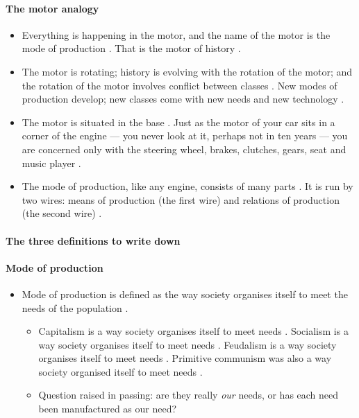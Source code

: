 \paragraph{The motor analogy}
\begin{itemize}
    \item Everything is happening in the motor, and the name of the motor is the mode of production . That is the motor of history .
    \item The motor is rotating; history is evolving with the rotation of the motor; and the rotation of the motor involves conflict between classes . New modes of production develop; new classes come with new needs and new technology .
    \item The motor is situated in the base . Just as the motor of your car sits in a corner of the engine --- you never look at it, perhaps not in ten years --- you are concerned only with the steering wheel, brakes, clutches, gears, seat and music player .
    \item The mode of production, like any engine, consists of many parts . It is run by two wires: means of production (the first wire) and relations of production (the second wire) .
\end{itemize}

\paragraph{The three definitions to write down}

\paragraph{Mode of production}
\begin{itemize}
    \item Mode of production is defined as the way society organises itself to meet the needs of the population .
    \begin{itemize}
        \item Capitalism is a way society organises itself to meet needs . Socialism is a way society organises itself to meet needs . Feudalism is a way society organises itself to meet needs . Primitive communism was also a way society organised itself to meet needs .
        \item Question raised in passing: are they really \emph{our} needs, or has each need been manufactured as our need? 
    \end{itemize}
\end{itemize}

